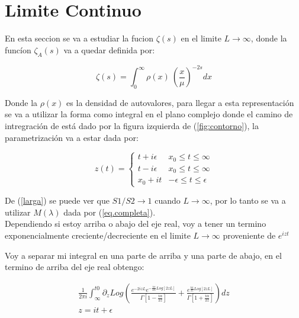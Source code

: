 \chapter{Limite Continuo}

En esta seccion se va a estudiar la fucion $\zeta (s) $ en el limite $L \rightarrow \infty$, donde la funcíon $\zeta _A (s)$ va a quedar definida por:

\begin{equation}
\zeta (s) = \int _{0} ^{\infty} \rho (x) \ \left( \frac{x}{\mu } \right) ^{-2 s} dx
\end{equation}

Donde la $\rho(x) $ es la densidad de autovalores, para llegar a esta representación se va a utilizar la forma como integral en el plano complejo donde el camino de intregración de está dado por la figura izquierda de (\ref{fig:contorno}), la parametrización va a estar dada por:


\[
z(t) =  
	  \begin{cases} 
      t + i \epsilon  & x _0 \leq t \leq \infty \\
      t - i \epsilon  & x _0 \leq t \leq \infty \\
      x _0 + i t		  & - \epsilon \leq t \leq \epsilon
   \end{cases}
\]

De (\ref{larga}) se puede ver que $S1/S2 \rightarrow 1$ cuando $L \rightarrow \infty$, por lo tanto se va a utilizar $M ( \lambda)$ dada por (\ref{eq.completa}).\\



Dependiendo si estoy arriba o abajo del eje real, voy a tener un termino exponencialmente creciente/decreciente en el limite $L \rightarrow \infty$ proveniente de $e ^{i z t}$

Voy a separar mi integral en una parte de arriba y una parte de abajo, en el termino de arriba del eje real obtengo:

\begin{equation}
\begin{array}{c}
\frac{1}{2 \pi i} \int _{\infty} ^{t0} 
\partial _z
Log
\left(
\frac{e ^{-2 i z  L } e ^{- \frac{i \alpha}{2 \lambda} Log[2 z  L]} }{\Gamma[1-\frac{i \alpha}{2 z }]} +
\frac{e ^{ \frac{i \alpha}{2 z } Log[2 z  L]} }{\Gamma[1+\frac{i \alpha}{2 z }]}
\right) d z \\
z = i t + \epsilon 
\end{array}
\end{equation}

